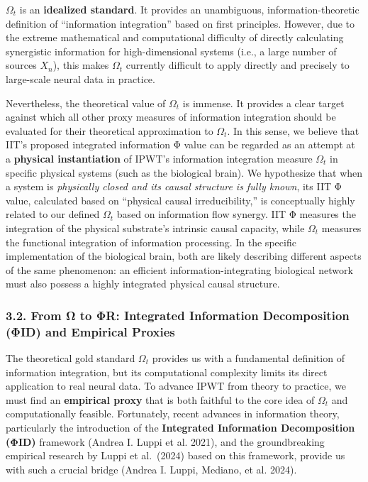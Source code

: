 \documentclass[
  a4paper]{article}
\begin{document}
\(\Omega_t\) is an \textbf{idealized standard}. It provides an
unambiguous, information-theoretic definition of ``information
integration'' based on first principles. However, due to the extreme
mathematical and computational difficulty of directly calculating
synergistic information for high-dimensional systems (i.e., a large
number of sources \(X_n\)), this makes \(\Omega_t\) currently difficult
to apply directly and precisely to large-scale neural data in practice.

Nevertheless, the theoretical value of \(\Omega_t\) is immense. It
provides a clear target against which all other proxy measures of
information integration should be evaluated for their theoretical
approximation to \(\Omega_t\). In this sense, we believe that IIT's
proposed integrated information Φ value can be regarded as an attempt at
a \textbf{physical instantiation} of IPWT's information integration
measure \(\Omega_t\) in specific physical systems (such as the
biological brain). We hypothesize that when a system is \emph{physically
closed and its causal structure is fully known}, its IIT Φ value,
calculated based on ``physical causal irreducibility,'' is conceptually
highly related to our defined \(\Omega_t\) based on information flow
synergy. IIT Φ measures the integration of the physical substrate's
intrinsic causal capacity, while \(\Omega_t\) measures the functional
integration of information processing. In the specific implementation of
the biological brain, both are likely describing different aspects of
the same phenomenon: an efficient information-integrating biological
network must also possess a highly integrated physical causal structure.

\subsubsection{3.2. From Ω to ΦR: Integrated Information Decomposition
(ΦID) and Empirical
Proxies}\label{from-ux3c9-to-ux3c6r-integrated-information-decomposition-ux3c6id-and-empirical-proxies}

The theoretical gold standard \(\Omega_t\) provides us with a
fundamental definition of information integration, but its computational
complexity limits its direct application to real neural data. To advance
IPWT from theory to practice, we must find an \textbf{empirical proxy}
that is both faithful to the core idea of \(\Omega_t\) and
computationally feasible. Fortunately, recent advances in information
theory, particularly the introduction of the \textbf{Integrated
Information Decomposition (ΦID)} framework (Andrea I. Luppi et al.
2021), and the groundbreaking empirical research by Luppi et al.~(2024)
based on this framework, provide us with such a crucial bridge (Andrea
I. Luppi, Mediano, et al. 2024).
\end{document}
